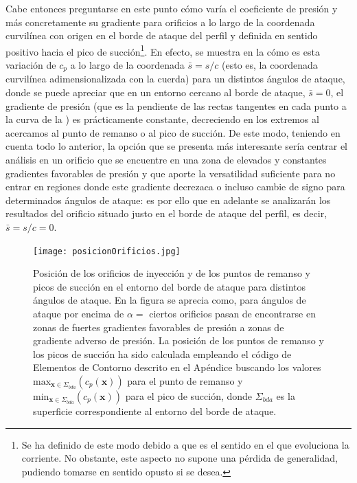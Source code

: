 Cabe entonces preguntarse en este punto cómo varía el coeficiente de presión y más concretamente su gradiente para orificios a lo largo de la coordenada curvilínea con origen en el borde de ataque del perfil y definida en sentido positivo hacia el pico de succión\footnote{Se ha definido de este modo debido a que es el sentido en el que evoluciona la corriente. No obstante, este aspecto no supone una pérdida de generalidad, pudiendo tomarse en sentido opusto si se desea.}. En efecto, se muestra en la  cómo es esta variación de $c_{p}$ a lo largo de la coordenada $\bar{s} = s/c$ (esto es, la coordenada curvilínea adimensionalizada con la cuerda) para un distintos ángulos de ataque, donde se puede apreciar que en un entorno cercano al borde de ataque, $\bar{s} = 0$, el gradiente de presión (que es la pendiente de las rectas tangentes en cada punto a la curva de la ) es prácticamente constante, decreciendo en los extremos al acercamos al punto de remanso o al pico de succión. De este modo, teniendo en cuenta todo lo anterior, la opción que se presenta más interesante sería centrar el análisis en un orificio que se encuentre en una zona de elevados y constantes gradientes favorables de presión y que aporte la versatilidad suficiente para no entrar en regiones donde este gradiente decrezaca o incluso cambie de signo para determinados ángulos de ataque: es por ello que en adelante se analizarán los resultados del orificio situado justo en el borde de ataque del perfil, es decir, $\bar{s} = s/c = 0$. 


\begin{figure}
\centering
\texttt{[image: posicionOrificios.jpg]}
\caption{Posición de los orificios de inyección y de los puntos de remanso y picos de succión en el entorno del borde de ataque para distintos ángulos de ataque. En la figura se aprecia como, para ángulos de ataque por encima de $\alpha = $ %
ciertos orificios pasan de encontrarse en zonas de fuertes gradientes favorables de presión a zonas de gradiente adverso de presión. La posición de los puntos de remanso y los picos de succión ha sido calculada empleando el código de Elementos de Contorno descrito en el Apéndice %
buscando los valores $\mathrm{max}_{\mathbf{x}\in\Sigma_{bda}}\left(c_{p}\left(\mathbf{x}\right)\right)$ para el punto de remanso y $\mathrm{min}_{\mathbf{x}\in\Sigma_{bda}}\left(c_{p}\left(\mathbf{x}\right)\right)$ para el pico de succión, donde $\Sigma_{bda}$ es la superficie correspondiente al entorno del borde de ataque.}
\end{figure}

